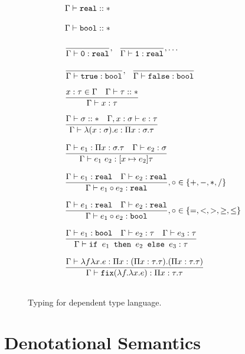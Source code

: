 \begin{figure}
\[
\begin{array}{lr}
\Gamma \vdash \texttt{real} :: * \\ \\
\Gamma \vdash \texttt{bool} :: * \\ \\
\dfrac{}{\Gamma \vdash \texttt{0}: \texttt{real}}, \ \ \dfrac{}{\Gamma \vdash \texttt{1}: \texttt{real}}, \ldots \\ \\
\dfrac{}{\Gamma \vdash \texttt{true} : \texttt{bool}}, \ \ \dfrac{}{\Gamma \vdash \texttt{false} : \texttt{bool}} \\  \\
\dfrac{x : \tau \in \Gamma \ \ \ \Gamma \vdash \tau :: *}{\Gamma \vdash x : \tau } \\ \\ 
\dfrac{\Gamma \vdash \sigma :: * \ \ \ \Gamma, x : \sigma \vdash e : \tau}
	{\Gamma \vdash \lambda (x : \sigma).e : \Pi x:\sigma.\tau } \\ \\
\dfrac{\Gamma \vdash e_1: \Pi x:\sigma.\tau \ \ \ \Gamma \vdash e_2 : \sigma}
	{\Gamma \vdash e_1 \ e_2 : [x \mapsto e_2]\tau} \\ \\
\dfrac{\Gamma \vdash e_1 : \texttt{real} \ \ \ \Gamma \vdash e_2 : \texttt{real}}
	{\Gamma \vdash e_1 \circ e_2 : \texttt{real}}
, \circ \in \{+,-,*,/\} \\ \\ 
\dfrac{\Gamma \vdash e_1 : \texttt{real} \ \ \ \Gamma \vdash e_2 : \texttt{real}}
	{\Gamma \vdash e_1 \circ e_2 : \texttt{bool}}
	, \circ \in \{=, <, >, \geq, \leq\} \\ \\ 
\dfrac{\Gamma \vdash e_1 : \texttt{bool} \ \ \ \Gamma \vdash e_2 : \tau \ \ \ \Gamma \vdash e_3 : \tau}
	{\Gamma \vdash \ifelse{e_1}{e_2}{e_3} : \tau} \\ \\ 
\dfrac{\Gamma \vdash \lambda f \lambda x.e : \Pi x:(\Pi x:\tau.\tau).(\Pi x:\tau.\tau)}
	{\Gamma \vdash \texttt{fix}(\lambda f. \lambda x.e) : \Pi x:\tau.\tau} \\ \\ 
\end{array}
\]
\caption{Typing for dependent type language.}
\end{figure}

\section{Denotational Semantics}
 
